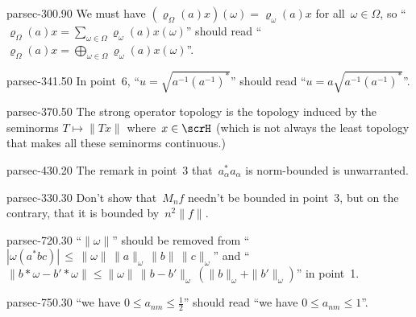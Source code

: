 \documentclass[b5page]{book}
\begin{document}
\begin{erratum}{parsec-300.90}
We must have $(\varrho_\Omega(a)x)(\omega)
= \varrho_\omega(a)x$
for all~$\omega\in\Omega$,
so
``$\varrho_\Omega(a)x = \sum_{\omega\in\Omega}
\varrho_\omega(a)x(\omega)$''
should read
``$\varrho_\Omega(a)x = \bigoplus_{\omega\in\Omega}
\varrho_\omega(a)x(\omega)$''.
\end{erratum}
\begin{erratum}{parsec-341.50}
In point~6, ``$u=\sqrt{a^{-1}(a^{-1})^*}$''
should read ``$u=a\sqrt{a^{-1}(a^{-1})^*}$''.
\end{erratum}
\begin{erratum}{parsec-370.50}
The strong operator topology is the topology
induced by the seminorms $T\mapsto \|Tx\|$ where~$x\in \scrH$
(which is not always the least topology that makes
all these seminorms continuous.)
\end{erratum}
\begin{erratum}{parsec-430.20}
The remark in point~3 that~$a_\alpha^*a_\alpha$
is norm-bounded is unwarranted.
\end{erratum}
\begin{erratum}{parsec-330.30}
Don't show that~$M_nf$ needn't be bounded
in point~3,
but on the contrary, that it is bounded by~$n^2\|f\|$.
\end{erratum}
\begin{erratum}{parsec-720.30}
``$\|\omega\|$''
should be removed
from
``$\left|\omega(a^*bc)\right|\,\leq\,
\|\omega\|\,\|a\|_\omega\,\|b\|\,\|c\|_\omega$''
and 
``$\|b\ast \omega-b'\ast \omega\|
\leq \|\omega\|\,\|b-b'\|_\omega\,(\|b\|_\omega+\|b'\|_\omega)$''
in point~1.
\end{erratum}
\begin{erratum}{parsec-750.30}
``we have $0\leq a_{nm}\leq \frac{1}{2}$''
should read ``we have $0\leq a_{nm}\leq 1$''.
\end{erratum}
\end{document}
